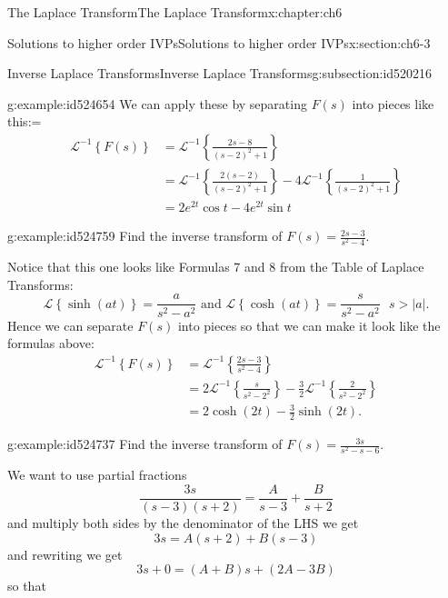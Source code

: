 \documentclass[oneside,10pt,]{book}
\numberwithin{equation}{section}
\numberwithin{equation}{section}
\newcommand{\amp}{&}
\begin{document}
\begin{chapterptx}{The Laplace Transform}{}{The Laplace Transform}{}{}{x:chapter:ch6}
\begin{sectionptx}{Solutions to higher order IVPs}{}{Solutions to higher order IVPs}{}{}{x:section:ch6-3}
\begin{subsectionptx}{Inverse Laplace Transforms}{}{Inverse Laplace Transforms}{}{}{g:subsection:id520216}
\begin{example}{}{g:example:id524654}
We can apply these by separating \(F(s)\) into pieces like this:=%
\begin{align*}
\mathcal{L}^{-1}\left\{ F(s)\right\}  \amp =\mathcal{L}^{-1}\left\{ \frac{2s-8}{\left(s-2\right)^{2}+1}\right\} \\
\amp =\mathcal{L}^{-1}\left\{ \frac{2\left(s-2\right)}{\left(s-2\right)^{2}+1}\right\} -4\mathcal{L}^{-1}\left\{ \frac{1}{\left(s-2\right)^{2}+1}\right\} \\
\amp =2e^{2t}\cos t-4e^{2t}\sin t
\end{align*}
%
\end{example}
\begin{example}{}{g:example:id524759}%
Find the inverse transform of \(F(s)=\frac{2s-3}{s^{2}-4}\).%
\par
Notice that this one looks like Formulas 7 and 8 from the Table of Laplace Transforms:%
\begin{equation*}
\mathcal{L}\left\{ \sinh(at)\right\} =\frac{a}{s^{2}-a^{2}}\text{ and }\mathcal{L}\left\{ \cosh\left(at\right)\right\} =\frac{s}{s^{2}-a^{2}}\,\,\,\,s>\left|a\right|.
\end{equation*}
Hence we can separate \(F(s)\) into pieces so that we can make it look like the formulas above:%
\begin{align*}
\mathcal{L}^{-1}\left\{ F(s)\right\}  \amp =\mathcal{L}^{-1}\left\{ \frac{2s-3}{s^{2}-4}\right\} \\
\amp =2\mathcal{L}^{-1}\left\{ \frac{s}{s^{2}-2^{2}}\right\} -\frac{3}{2}\mathcal{L}^{-1}\left\{ \frac{2}{s^{2}-2^{2}}\right\} \\
\amp =2\cosh\left(2t\right)-\frac{3}{2}\sinh\left(2t\right).
\end{align*}
%
\end{example}
\begin{example}{}{g:example:id524737}%
Find the inverse transform of \(F(s)=\frac{3s}{s^{2}-s-6}\).%
\par
We want to use partial fractions%
\begin{equation*}
\frac{3s}{(s-3)(s+2)}=\frac{A}{s-3}+\frac{B}{s+2}
\end{equation*}
and multiply both sides by the denominator of the LHS we get%
\begin{equation*}
3s=A\left(s+2\right)+B\left(s-3\right)
\end{equation*}
and rewriting we get%
\begin{equation*}
3s+0=\left(A+B\right)s+\left(2A-3B\right)
\end{equation*}
so that%
\begin{equation*}

\end{equation*}
\end{example}
\end{subsectionptx}
\end{sectionptx}
\end{chapterptx}
\end{document}
